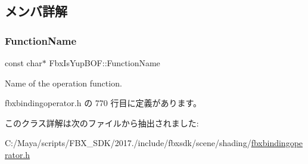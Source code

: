 \subsection{メンバ詳解}
\mbox{\label{class_fbx_is_yup_b_o_f_a0db8ffbc3f9941561f19ad457493f917}} 
\subsubsection{\texorpdfstring{Function\+Name}{FunctionName}}
{\footnotesize\ttfamily const char$\ast$ Fbx\+Is\+Yup\+B\+O\+F\+::\+Function\+Name\hspace{0.3cm}{\ttfamily [static]}}



Name of the operation function. 



 fbxbindingoperator.\+h の 770 行目に定義があります。



このクラス詳解は次のファイルから抽出されました\+:\begin{DoxyCompactItemize}
\item 
C\+:/\+Maya/scripts/\+F\+B\+X\+\_\+\+S\+D\+K/2017./include/fbxsdk/scene/shading/\hyperlink{fbxbindingoperator_8h}{fbxbindingoperator.\+h}\end{DoxyCompactItemize}
